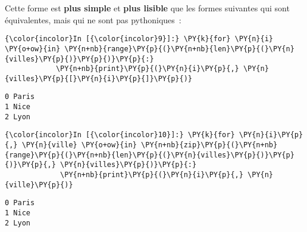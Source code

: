     Cette forme est \textbf{plus simple} et \textbf{plus lisible} que les
formes suivantes qui sont équivalentes, mais qui ne sont pas
pythoniques~:

    \begin{Verbatim}[commandchars=\\\{\}]
{\color{incolor}In [{\color{incolor}9}]:} \PY{k}{for} \PY{n}{i} \PY{o+ow}{in} \PY{n+nb}{range}\PY{p}{(}\PY{n+nb}{len}\PY{p}{(}\PY{n}{villes}\PY{p}{)}\PY{p}{)}\PY{p}{:}
            \PY{n+nb}{print}\PY{p}{(}\PY{n}{i}\PY{p}{,} \PY{n}{villes}\PY{p}{[}\PY{n}{i}\PY{p}{]}\PY{p}{)}
\end{Verbatim}


    \begin{Verbatim}[commandchars=\\\{\}]
0 Paris
1 Nice
2 Lyon

    \end{Verbatim}

    \begin{Verbatim}[commandchars=\\\{\}]
{\color{incolor}In [{\color{incolor}10}]:} \PY{k}{for} \PY{n}{i}\PY{p}{,} \PY{n}{ville} \PY{o+ow}{in} \PY{n+nb}{zip}\PY{p}{(}\PY{n+nb}{range}\PY{p}{(}\PY{n+nb}{len}\PY{p}{(}\PY{n}{villes}\PY{p}{)}\PY{p}{)}\PY{p}{,} \PY{n}{villes}\PY{p}{)}\PY{p}{:}
             \PY{n+nb}{print}\PY{p}{(}\PY{n}{i}\PY{p}{,} \PY{n}{ville}\PY{p}{)}
\end{Verbatim}


    \begin{Verbatim}[commandchars=\\\{\}]
0 Paris
1 Nice
2 Lyon

    \end{Verbatim}
